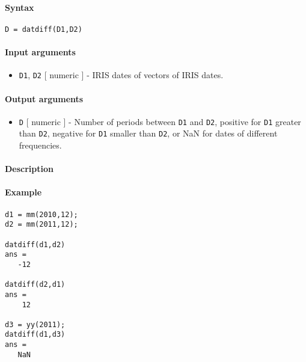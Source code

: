 


	\paragraph{Syntax}\label{syntax}

\begin{verbatim}
D = datdiff(D1,D2)
\end{verbatim}

\paragraph{Input arguments}\label{input-arguments}

\begin{itemize}
\itemsep1pt\parskip0pt
\item
  \texttt{D1}, \texttt{D2} {[} numeric {]} - IRIS dates of vectors of
  IRIS dates.
\end{itemize}

\paragraph{Output arguments}\label{output-arguments}

\begin{itemize}
\itemsep1pt\parskip0pt
\item
  \texttt{D} {[} numeric {]} - Number of periods between \texttt{D1} and
  \texttt{D2}, positive for \texttt{D1} greater than \texttt{D2},
  negative for \texttt{D1} smaller than \texttt{D2}, or NaN for dates of
  different frequencies.
\end{itemize}

\paragraph{Description}\label{description}

\paragraph{Example}\label{example}

\begin{verbatim}
d1 = mm(2010,12);
d2 = mm(2011,12);

datdiff(d1,d2)
ans =
   -12

datdiff(d2,d1)
ans =
    12

d3 = yy(2011);
datdiff(d1,d3)
ans =
   NaN
\end{verbatim}


